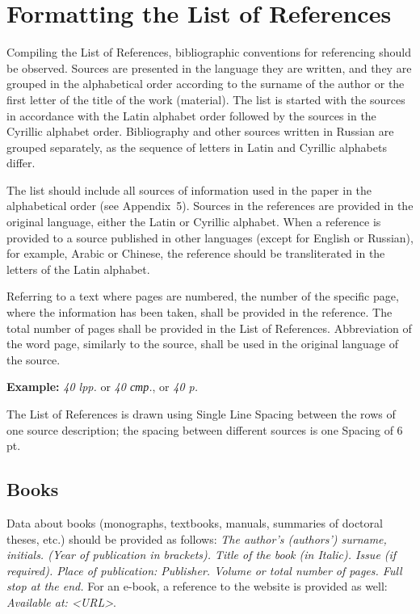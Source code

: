 \chapter{Formatting the List of References}

Compiling the List of References, bibliographic conventions for referencing should be observed. Sources are presented in the language they are written, and they are grouped in the alphabetical order according to the surname of the author or the first letter of the title of the work (material). The list is started with the sources in accordance with the Latin alphabet order followed by the sources in the Cyrillic alphabet order. Bibliography and other sources written in Russian are grouped separately, as the sequence of letters in Latin and Cyrillic alphabets differ.

The list should include all sources of information used in the paper in the alphabetical order (see Appendix~5). Sources in the references are provided in the original language, either the Latin or Cyrillic alphabet. When a reference is provided to a source published in other languages (except for English or Russian), for example, Arabic or Chinese, the reference should be transliterated in the letters of the Latin alphabet.

Referring to a text where pages are numbered, the number of the specific page, where the information has been taken, shall be provided in the reference. The total number of pages shall be provided in the List of References. Abbreviation of the word page, similarly to the source, shall be used in the original language of the source.

\noindent\textbf{Example:} \emph{40 lpp.} or \emph{40 стр.}, or \emph{40 p.}

The List of References is drawn using Single Line Spacing between the rows of one source description; the spacing between different sources is one Spacing of 6\,pt.

\section{Books}

Data about books (monographs, textbooks, manuals, summaries of doctoral theses, etc.) should be provided as follows: \emph{The author's (authors') surname, initials. (Year of publication in brackets). Title of the book (in Italic). Issue (if required). Place of publication: Publisher. Volume or total number of pages. Full stop at the end.} For an e-book, a reference to the website is provided as well: \emph{Available at: \textless URL\textgreater}.

